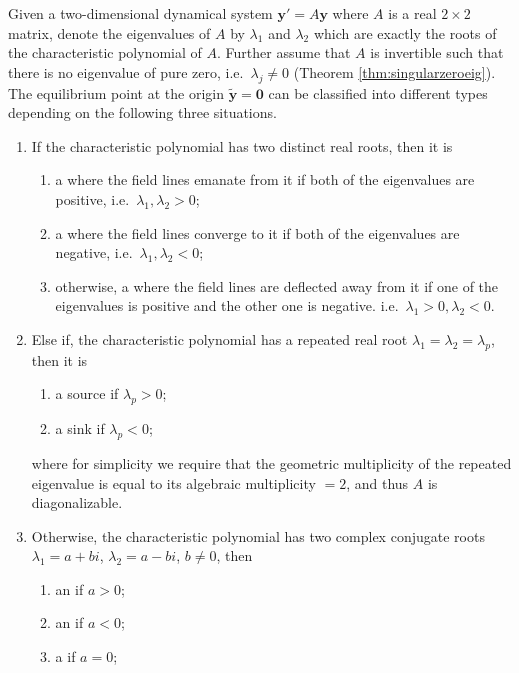 \begin{proper}
\label{proper:2dequiltypes}
Given a two-dimensional dynamical system $\textbf{y}' = A\textbf{y}$ where $A$ is a real $2 \times 2$ matrix, denote the eigenvalues of $A$ by $\lambda_1$ and $\lambda_2$ which are exactly the roots of the characteristic polynomial of $A$. Further assume that $A$ is invertible such that there is no eigenvalue of pure zero, i.e.\ $\lambda_j \neq 0$ (Theorem \ref{thm:singularzeroeig}). The equilibrium point at the origin $\tilde{\textbf{y}} = \textbf{0}$ can be classified into different types depending on the following three situations.
\begin{enumerate}
    \item If the characteristic polynomial has two distinct real roots, then it is
    \begin{enumerate}[label=(\alph*)]
        \item a  where the field lines emanate from it if both of the eigenvalues are positive, i.e.\ $\lambda_1, \lambda_2 > 0$;
        \item a  where the field lines converge to it if both of the eigenvalues are negative, i.e.\ $\lambda_1, \lambda_2 < 0$; 
        \item otherwise, a  where the field lines are deflected away from it if one of the eigenvalues is positive and the other one is negative. i.e.\ $\lambda_1 > 0, \lambda_2 < 0$.
    \end{enumerate}
    \item Else if, the characteristic polynomial has a repeated real root $\lambda_1 = \lambda_2 = \lambda_p$, then it is
    \begin{enumerate}[label=(\alph*)]
        \item a source if $\lambda_p > 0$;
        \item a sink if $\lambda_p < 0$; 
    \end{enumerate}
    where for simplicity we require that the geometric multiplicity of the repeated eigenvalue is equal to its algebraic multiplicity $= 2$, and thus $A$ is diagonalizable.
    \item Otherwise, the characteristic polynomial has two complex conjugate roots $\lambda_1 = a+bi$, $\lambda_2 = a-bi$, $b \neq 0$, then
    \begin{enumerate}[label=(\alph*)]
        \item an  if $a > 0$;
        \item an  if $a < 0$;
        \item a  if $a = 0$;
    \end{enumerate}
\end{enumerate}
\end{proper}
